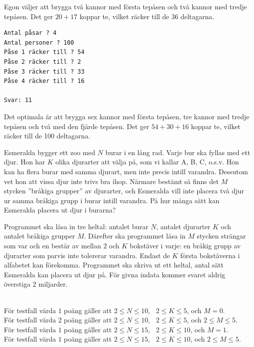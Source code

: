  Egon väljer att brygga två kannor med första tepåsen 
och två kannor med tredje tepåsen. Det ger $20+17$ koppar te, vilket
räcker till de 36 deltagarna.


\begin{verbatim}
Antal påsar ? 4
Antal personer ? 100
Påse 1 räcker till ? 54
Påse 2 räcker till ? 2
Påse 3 räcker till ? 33
Påse 4 räcker till ? 16

Svar: 11
\end{verbatim}


 Det optimala är att brygga sex kannor med första tepåsen,
tre kannor med tredje tepåsen och två med den fjärde tepåsen.
Det ger $54+30+16$ koppar te, vilket räcker till de 100  deltagarna.


\newpage
{}

Esmeralda bygger ett zoo med $N$ burar i en lång rad. Varje bur ska fyllas med ett djur. Hon har $K$ olika djurarter att välja på, som vi kallar A, B, C, o.s.v. Hon kan ha flera burar med samma djurart, men inte precis intill varandra. Dessutom vet hon att vissa djur inte trivs bra ihop. Närmare bestämt så finns det $M$ stycken ''bråkiga grupper'' av djurarter, och Esmeralda vill inte placera två djur ur samma bråkiga grupp i burar intill varandra. På hur många sätt kan Esmeralda placera ut djur i burarna?

Programmet ska läsa in tre heltal: antalet burar $N$, antalet djurarter $K$ och antalet bråkiga grupper $M$. Därefter ska programmet läsa in $M$ stycken strängar som var och en består av mellan $2$ och $K$ bokstäver i varje: en bråkig grupp av djurarter som parvis inte tolererar varandra. Endast de $K$ första bokstäverna i alfabetet kan förekomma. Programmet ska skriva ut ett heltal, antal sätt Esmeralda kan placera ut djur på. För givna indata kommer svaret aldrig överstiga 2 miljarder.

\\
För testfall värda $1$ poäng gäller att $2\le N \le 10$, $\;\;2\le K \le 5$, och $M=0$. \\
För testfall värda $2$ poäng gäller att $2\le N \le 10$, $\;\;2\le K \le 5$, och $2 \le M\le 5$. \\
För testfall värda $1$ poäng gäller att $2\le N \le 15$, $\;\;2\le K \le 10$, och $M=1$. \\
För testfall värda $1$ poäng gäller att $2\le N \le 15$, $\;\;2\le K \le 10$, och $2 \le M\le 5$. \\


